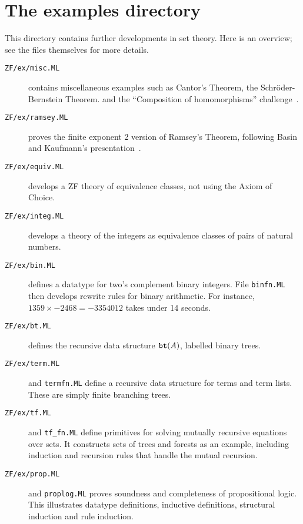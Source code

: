 \section{The examples directory}
This directory contains further developments in {\ZF} set theory.  Here is
an overview; see the files themselves for more details.
\begin{description}
\item[{\tt ZF/ex/misc.ML}] contains miscellaneous examples such as
  Cantor's Theorem, the Schr\"oder-Bernstein Theorem.  and the
  ``Composition of homomorphisms'' challenge~\cite{boyer86}.

\item[{\tt ZF/ex/ramsey.ML}]
proves the finite exponent 2 version of Ramsey's Theorem, following Basin
and Kaufmann's presentation~\cite{basin91}.

\item[{\tt ZF/ex/equiv.ML}]
develops a ZF theory of equivalence classes, not using the Axiom of Choice.

\item[{\tt ZF/ex/integ.ML}]
develops a theory of the integers as equivalence classes of pairs of
natural numbers.

\item[{\tt ZF/ex/bin.ML}]
defines a datatype for two's complement binary integers.  File
{\tt binfn.ML} then develops rewrite rules for binary
arithmetic.  For instance, $1359\times {-}2468 = {-}3354012$ takes under
14 seconds.

\item[{\tt ZF/ex/bt.ML}]
defines the recursive data structure ${\tt bt}(A)$, labelled binary trees.

\item[{\tt ZF/ex/term.ML}] 
  and {\tt termfn.ML} define a recursive data structure for
  terms and term lists.  These are simply finite branching trees.

\item[{\tt ZF/ex/tf.ML}]
  and {\tt tf_fn.ML} define primitives for solving mutually
  recursive equations over sets.  It constructs sets of trees and forests
  as an example, including induction and recursion rules that handle the
  mutual recursion.

\item[{\tt ZF/ex/prop.ML}]
  and {\tt proplog.ML} proves soundness and completeness of
  propositional logic.  This illustrates datatype definitions, inductive
  definitions, structural induction and rule induction.


\end{description}
